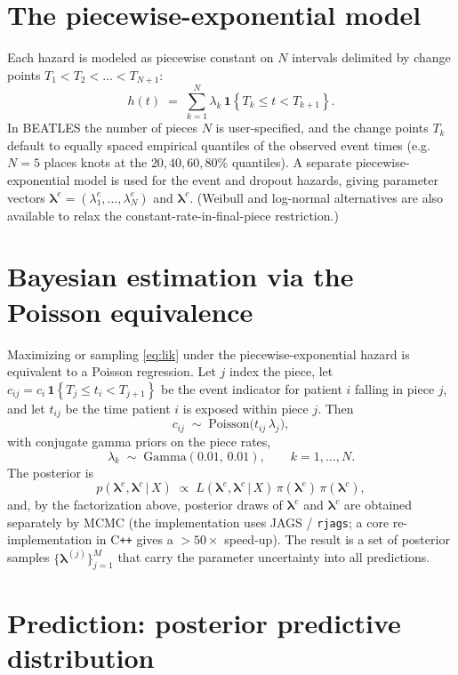 \documentclass[11pt]{article}
\newcommand{\given}{\,\vert\,}
\newcommand{\ind}[1]{\mathbf{1}\!\left\{#1\right\}}
\begin{document}
\section{The piecewise-exponential model}

Each hazard is modeled as piecewise constant on $N$ intervals delimited by
change points $T_1 < T_2 < \dots < T_{N+1}$:
\[
h(t) \;=\; \sum_{k=1}^{N} \lambda_k \, \ind{T_k \le t < T_{k+1}}.
\]
In BEATLES the number of pieces $N$ is user-specified, and the change points
$T_k$ default to equally spaced empirical quantiles of the observed event times
(e.g.\ $N=5$ places knots at the $20,40,60,80\%$ quantiles). A separate
piecewise-exponential model is used for the event and dropout hazards, giving
parameter vectors $\bm\lambda^{e}=(\lambda^e_1,\dots,\lambda^e_N)$ and
$\bm\lambda^{c}$. (Weibull and log-normal alternatives are also available to
relax the constant-rate-in-final-piece restriction.)

\section{Bayesian estimation via the Poisson equivalence}

Maximizing or sampling \eqref{eq:lik} under the piecewise-exponential hazard is
equivalent to a Poisson regression. Let $j$ index the piece, let
$c_{ij} = c_i \, \ind{T_j \le t_i < T_{j+1}}$ be the event indicator for
patient $i$ falling in piece $j$, and let $t_{ij}$ be the time patient $i$ is
exposed within piece $j$. Then
\[
c_{ij} \;\sim\; \mathrm{Poisson}\!\big(t_{ij}\,\lambda_j\big),
\]
with conjugate gamma priors on the piece rates,
\[
\lambda_k \;\sim\; \mathrm{Gamma}(0.01,\,0.01), \qquad k = 1,\dots,N .
\]
The posterior is
\[
p(\bm\lambda^{e},\bm\lambda^{c} \given X)
\;\propto\;
L(\bm\lambda^{e},\bm\lambda^{c}\given X)\,
\pi(\bm\lambda^{e})\,\pi(\bm\lambda^{c}),
\]
and, by the factorization above, posterior draws of $\bm\lambda^{e}$ and
$\bm\lambda^{c}$ are obtained separately by MCMC (the implementation uses JAGS
/ \texttt{rjags}; a core re-implementation in C\texttt{++} gives a $>\!50\times$
speed-up). The result is a set of posterior samples
$\{\bm\lambda^{(j)}\}_{j=1}^{M}$ that carry the parameter uncertainty into all
predictions.

\section{Prediction: posterior predictive distribution}
\end{document}
